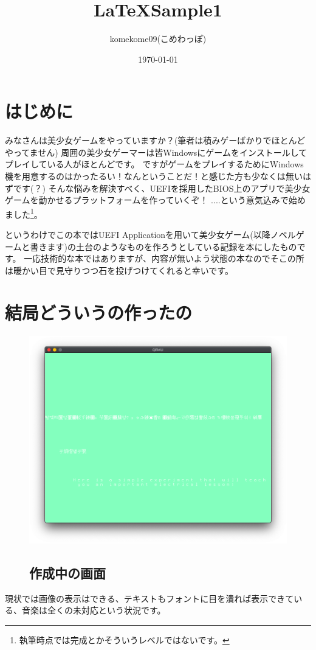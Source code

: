 \documentclass[10pt, b5paper, openany]{ltjsbook}
\title{ \LaTeX Sample1 }
\author{ komekome09(こめわっぽ) }
\date{ \today }
\begin{document}
\chapter*{はじめに}
みなさんは美少女ゲームをやっていますか？(筆者は積みゲーばかりでほとんどやってません)
周囲の美少女ゲーマーは皆Windowsにゲームをインストールしてプレイしている人がほとんどです。
ですがゲームをプレイするためにWindows機を用意するのはかったるい！なんということだ！と感じた方も少なくは無いはずです(？)
そんな悩みを解決すべく、UEFIを採用したBIOS上のアプリで美少女ゲームを動かせるプラットフォームを作っていくぞ！
....という意気込みで始めました\footnote{執筆時点では完成とかそういうレベルではないです。}。

というわけでこの本ではUEFI Applicationを用いて美少女ゲーム(以降ノベルゲームと書きます)の土台のようなものを作ろうとしている記録を本にしたものです。
一応技術的な本ではありますが、内容が無いよう状態の本なのでそこの所は暖かい目で見守りつつ石を投げつけてくれると幸いです。

\tableofcontents
\clearpage

\chapter{結局どういうの作ったの}
\begin{figure}[H]
    \centering
    \includegraphics[scale=0.3]{pic/screenshot.png}
    \section{作成中の画面}
    \label{fig:screenshot}
\end{figure}
現状では画像の表示はできる、テキストもフォントに目を潰れば表示できている、音楽は全くの未対応という状況です。
\end{document}
